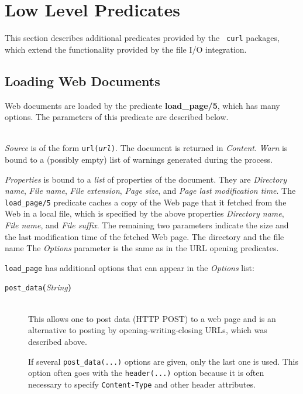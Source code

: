 \section{Low Level Predicates}

This section describes additional predicates provided by the {\tt
  curl} packages, which extend the functionality provided by the file I/O
integration.

\subsection{Loading Web Documents}

Web documents are loaded by the predicate {\bf load\_page/5}, which has
many options. The parameters of this predicate are described below.


\begin{description}
\item[load\_page({\it +Source, +Options, -Properties, -Content, -Warn})]\mbox{}
  \\
  {\it Source} is of the form {\tt url({\it {url}})}.
  The document is returned in {\it Content}.
  {\it Warn} is bound to a (possibly empty) list of warnings generated during the process.

  {\it Properties} is bound to a \emph{list} of properties of the document. They
  are {\it Directory name}, {\it File name}, {\it File extension}, {\it
    Page size}, and {\it Page last modification time}.
  The {\tt load\_page/5}  predicate caches a copy of the Web page that it
  fetched from the Web in a local file, which is specified by the above
  properties \emph{Directory name}, \emph{File name}, and \emph{File
    suffix}. The remaining two parameters indicate the size and the last
  modification time of the fetched Web page.
  The directory and the file name 
  The \emph{Options} parameter is the same as in the URL opening
  predicates. 

  \texttt{load\_page} has additional options that can appear in the
  \emph{Options} list:
  \begin{description}
  \item[{\tt post\_data}{\bf (}{\it String}{\bf )}]\mbox{}\\
    This allows one to post data (HTTP POST)
    to a web page and is an alternative to
    posting by opening-writing-closing URLs, which was described above.

    If several \texttt{post\_data(...)} options are given, only the last one is
    used. This option often goes with the \texttt{header(...)} option because it
    is often necessary to specify \texttt{Content-Type} and other header
    attributes.  


\end{description}
\end{description}
